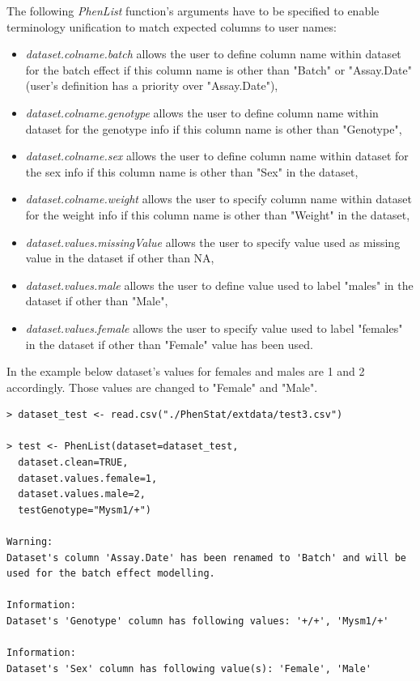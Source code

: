 \documentclass[12pt,a4paper]{article}
\begin{document}
The following \textit{PhenList} function's arguments have to be specified to enable terminology unification to match expected columns to user names:
\begin{itemize}
\item \textit{dataset.colname.batch} allows the user to define column name within dataset for the batch effect if this column name is other than "Batch" or "Assay.Date" (user's definition has a priority over "Assay.Date"), 
\item \textit{dataset.colname.genotype} allows the user to define column name within dataset for the genotype info if this column name is other than "Genotype", 
\item \textit{dataset.colname.sex} allows the user to define column name within dataset for the sex info if this column name is other than "Sex" in the dataset, 
\item \textit{dataset.colname.weight}  allows the user to specify column name within dataset for the weight info if this column name is other than "Weight" in the dataset, 
\item \textit{dataset.values.missingValue}  allows the user to specify value used as missing value in the dataset if other than NA,
\item \textit{dataset.values.male} allows the user to define value used to label "males" in the dataset if other than "Male", 
\item \textit{dataset.values.female} allows the user to specify value used to label "females" in the dataset if other than "Female" value has been used.
\end{itemize} 

In the example below dataset's values for females and males are 1 and 2 accordingly. Those values are changed to "Female" and "Male".  
\begingroup
    \fontsize{8pt}{12pt}\selectfont
\begin{verbatim}
> dataset_test <- read.csv("./PhenStat/extdata/test3.csv")

> test <- PhenList(dataset=dataset_test, 
  dataset.clean=TRUE, 
  dataset.values.female=1, 
  dataset.values.male=2, 
  testGenotype="Mysm1/+")

Warning:
Dataset's column 'Assay.Date' has been renamed to 'Batch' and will be used for the batch effect modelling.

Information:
Dataset's 'Genotype' column has following values: '+/+', 'Mysm1/+'

Information:
Dataset's 'Sex' column has following value(s): 'Female', 'Male'  
\end{verbatim}
\endgroup
\end{document}
